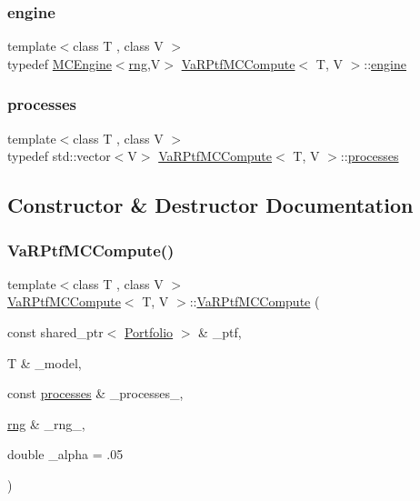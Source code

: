 \subsubsection{\texorpdfstring{engine}{engine}}
{\footnotesize\ttfamily template$<$class T , class V $>$ \\
typedef \hyperlink{classMCEngine}{M\+C\+Engine}$<$\hyperlink{classrng}{rng},V$>$ \hyperlink{classVaRPtfMCCompute}{Va\+R\+Ptf\+M\+C\+Compute}$<$ T, V $>$\+::\hyperlink{classVaRPtfMCCompute_a77b17bb3264e1b7e90485290d84f9ed0}{engine}}

\hypertarget{classVaRPtfMCCompute_a019d051e785efc490f2428be67bfb752}{}\label{classVaRPtfMCCompute_a019d051e785efc490f2428be67bfb752} 
\subsubsection{\texorpdfstring{processes}{processes}}
{\footnotesize\ttfamily template$<$class T , class V $>$ \\
typedef std\+::vector$<$V$>$ \hyperlink{classVaRPtfMCCompute}{Va\+R\+Ptf\+M\+C\+Compute}$<$ T, V $>$\+::\hyperlink{classVaRPtfMCCompute_a019d051e785efc490f2428be67bfb752}{processes}}



\subsection{Constructor \& Destructor Documentation}
\hypertarget{classVaRPtfMCCompute_aa3549f10b2f7e51c4fc213cf1c58268c}{}\label{classVaRPtfMCCompute_aa3549f10b2f7e51c4fc213cf1c58268c} 
\subsubsection{\texorpdfstring{Va\+R\+Ptf\+M\+C\+Compute()}{VaRPtfMCCompute()}}
{\footnotesize\ttfamily template$<$class T , class V $>$ \\
\hyperlink{classVaRPtfMCCompute}{Va\+R\+Ptf\+M\+C\+Compute}$<$ T, V $>$\+::\hyperlink{classVaRPtfMCCompute}{Va\+R\+Ptf\+M\+C\+Compute} (\begin{DoxyParamCaption}\item[{const shared\+\_\+ptr$<$ \hyperlink{classPortfolio}{Portfolio} $>$ \&}]{\+\_\+ptf,  }\item[{T \&}]{\+\_\+model,  }\item[{const \hyperlink{classVaRPtfMCCompute_a019d051e785efc490f2428be67bfb752}{processes} \&}]{\+\_\+processes\+\_\+,  }\item[{\hyperlink{classrng}{rng} \&}]{\+\_\+rng\+\_\+,  }\item[{double}]{\+\_\+alpha = {\ttfamily .05} }\end{DoxyParamCaption})\hspace{0.3cm}{\ttfamily [inline]}}

